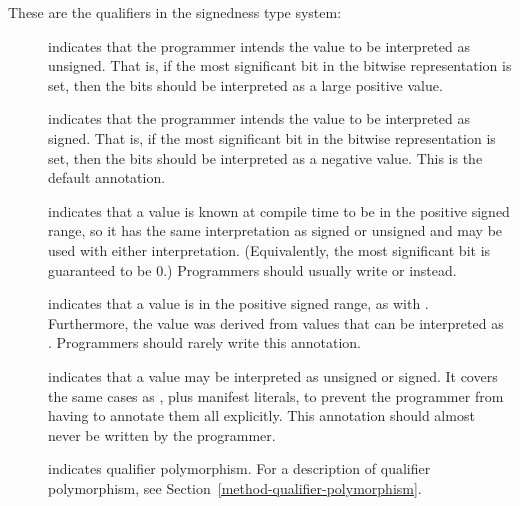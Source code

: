 These are the qualifiers in the signedness type system:

\begin{description}

\item[]
    indicates that the programmer intends the value to be
    interpreted as unsigned.
    That is, if the most significant bit in the bitwise representation is
    set, then the bits should be interpreted as a large positive value.

\item[]
    indicates that the programmer intends the value to be
    interpreted as signed.
    That is, if the most significant bit in the bitwise representation is
    set, then the bits should be interpreted as a negative value.
    This is the default annotation.

\item[]
    indicates that a value is known at compile time to be in the positive
    signed range, so it has the same interpretation as signed or unsigned
    and may be used with either interpretation.  (Equivalently, the most
    significant bit is guaranteed to be 0.)  Programmers should usually
    write  or
     instead.

\item[]
    indicates that a value is in the positive signed range, as with
    .  Furthermore,
    the value was derived from values that can be interpreted as
    .  Programmers should
    rarely write this annotation.

\item[]
    indicates that a value may be interpreted as unsigned or signed.  It
    covers the same cases as
    , plus manifest literals, to
    prevent the programmer from having to annotate them all explicitly.
    This annotation should almost never be written by the
    programmer.

 \item[]
   indicates qualifier polymorphism.
   For a description of qualifier polymorphism, see
   Section~\ref{method-qualifier-polymorphism}.


\end{description}

